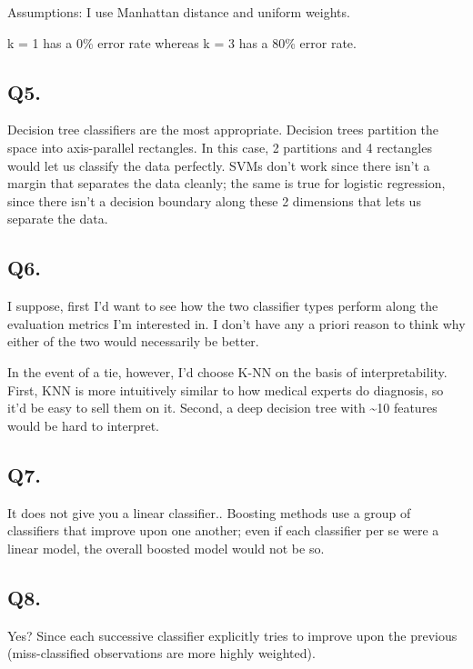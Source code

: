 \documentclass[]{article}
\begin{document}
Assumptions: I use Manhattan distance and uniform weights.

k = 1 has a 0\% error rate whereas k = 3 has a 80\% error rate.

\hypertarget{q5.}{%
\subsection{Q5.}\label{q5.}}

Decision tree classifiers are the most appropriate. Decision trees
partition the space into axis-parallel rectangles. In this case, 2
partitions and 4 rectangles would let us classify the data perfectly.
SVMs don't work since there isn't a margin that separates the data
cleanly; the same is true for logistic regression, since there isn't a
decision boundary along these 2 dimensions that lets us separate the
data.

\hypertarget{q6.}{%
\subsection{Q6.}\label{q6.}}

I suppose, first I'd want to see how the two classifier types perform
along the evaluation metrics I'm interested in. I don't have any a
priori reason to think why either of the two would necessarily be
better.

In the event of a tie, however, I'd choose K-NN on the basis of
interpretability. First, KNN is more intuitively similar to how medical
experts do diagnosis, so it'd be easy to sell them on it. Second, a deep
decision tree with \textasciitilde{}10 features would be hard to
interpret.

\hypertarget{q7.}{%
\subsection{Q7.}\label{q7.}}

It does not give you a linear classifier.. Boosting methods use a group
of classifiers that improve upon one another; even if each classifier
per se were a linear model, the overall boosted model would not be so.

\hypertarget{q8.}{%
\subsection{Q8.}\label{q8.}}

Yes? Since each successive classifier explicitly tries to improve upon
the previous (miss-classified observations are more highly weighted).
\end{document}
